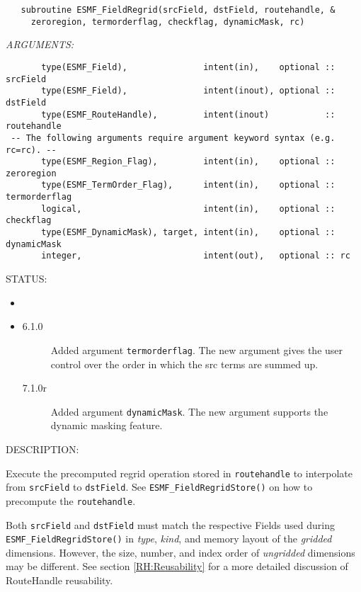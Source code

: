   
\begin{verbatim}   subroutine ESMF_FieldRegrid(srcField, dstField, routehandle, &
     zeroregion, termorderflag, checkflag, dynamicMask, rc)\end{verbatim}{\em ARGUMENTS:}
\begin{verbatim}       type(ESMF_Field),               intent(in),    optional :: srcField
       type(ESMF_Field),               intent(inout), optional :: dstField
       type(ESMF_RouteHandle),         intent(inout)           :: routehandle
 -- The following arguments require argument keyword syntax (e.g. rc=rc). --
       type(ESMF_Region_Flag),         intent(in),    optional :: zeroregion
       type(ESMF_TermOrder_Flag),      intent(in),    optional :: termorderflag
       logical,                        intent(in),    optional :: checkflag
       type(ESMF_DynamicMask), target, intent(in),    optional :: dynamicMask
       integer,                        intent(out),   optional :: rc \end{verbatim}
{\sf STATUS:}
   \begin{itemize}
   \item{}
   \item{}
   \begin{description}
   \item[6.1.0] Added argument {\tt termorderflag}.
                The new argument gives the user control over the order in which
                the src terms are summed up.
   \item[7.1.0r] Added argument {\tt dynamicMask}.
                The new argument supports the dynamic masking feature.
   \end{description}
   \end{itemize}
  
{\sf DESCRIPTION:\\ }


     Execute the precomputed regrid operation stored in {\tt routehandle} to 
     interpolate from {\tt srcField} to {\tt dstField}.  See {\tt ESMF\_FieldRegridStore()} on how to 
     precompute the {\tt routehandle}. 
    
     \begin{sloppypar}
     Both {\tt srcField} and {\tt dstField} must match the respective Fields
     used during {\tt ESMF\_FieldRegridStore()} in {\em type}, {\em kind}, and 
     memory layout of the {\em gridded} dimensions. However, the size, number, 
     and index order of {\em ungridded} dimensions may be different. See section
     \ref{RH:Reusability} for a more detailed discussion of RouteHandle 
     reusability.
     \end{sloppypar}
  
